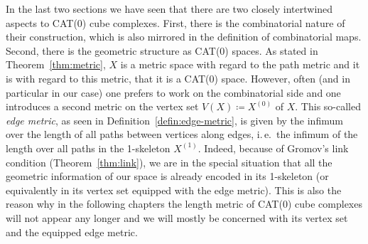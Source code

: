 

\begin{rem}
  \label{rem:geom-comb}
  In the last two sections we have seen that there are two closely intertwined aspects to CAT(0) cube complexes. First, there is the combinatorial nature of their construction, which is also mirrored in the definition of combinatorial maps. Second, there is the geometric structure as CAT(0) spaces. As stated in Theorem~\ref{thm:metric}, \(X\) is a metric space with regard to the path metric and it is with regard to this metric, that it is a CAT(0) space. However, often (and in particular in our case) one prefers to work on the combinatorial side and one introduces a second metric on the vertex set \(V(X) \coloneqq X^{(0)}\)  of \(X\). This so-called \emph{edge metric}, as seen in Definition~\ref{defin:edge-metric}, is given by the infimum over the length of all paths between vertices along edges, i.\,e.\ the infimum of the length over all paths in the 1-skeleton \(X^{(1)}\). Indeed, because of Gromov's link condition (Theorem~\ref{thm:link}), we are in the special situation that all the geometric information of our space is already encoded in its 1-skeleton (or equivalently in its vertex set equipped with the edge metric). This is also the reason why in the following chapters the length metric of CAT(0) cube complexes will not appear any longer and we will mostly be concerned with its vertex set and the equipped edge metric.
\end{rem}

